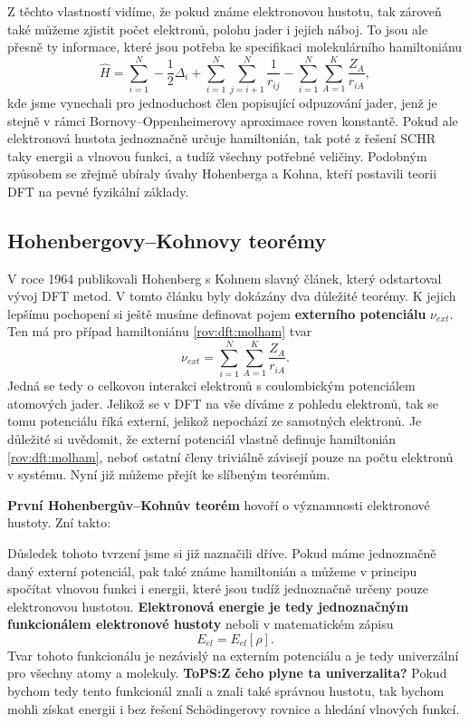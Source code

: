 Z těchto vlastností vidíme, že pokud známe elektronovou hustotu, tak zároveň také můžeme zjistit počet elektronů, polohu jader i jejich náboj. To jsou ale přesně ty informace, které jsou potřeba ke specifikaci molekulárního hamiltoniánu
\begin{equation}
\hat{H}=\sum_{i=1}^N -\frac{1}{2}\Delta_i+\sum_{i=1}^N\sum_{j=i+1}^N\frac{1}{r_{ij}}-\sum_{i=1}^N\sum_{A=1}^K \frac{Z_A}{r_{iA}} ,
\label{rov:dft:molham}
\end{equation}
kde jsme vynechali pro jednoduchost člen popisující odpuzování jader, jenž je stejně v rámci Bornovy--Oppenheimerovy aproximace roven konstantě. Pokud ale elektronová hustota jednoznačně určuje hamiltonián, tak poté z řešení SCHR taky energii a vlnovou funkci, a tudíž všechny potřebné veličiny. Podobným způsobem se zřejmě ubíraly úvahy Hohenberga a Kohna, kteří postavili teorii DFT na pevné fyzikální základy.

\subsection{Hohenbergovy--Kohnovy teorémy}

V roce 1964 publikovali Hohenberg s Kohnem slavný článek, který odstartoval vývoj DFT metod.
V tomto článku byly dokázány dva důležité teorémy. K jejich lepšímu pochopení si ještě musíme definovat pojem \textbf{externího potenciálu} $\nu_{ext}$. Ten má pro případ hamiltoniánu \eqref{rov:dft:molham} tvar
\begin{equation}
\nu_{ext} = \sum_{i=1}^N\sum_{A=1}^K \frac{Z_A}{r_{iA}} .
\end{equation} 
Jedná se tedy o celkovou interakci elektronů s coulombickým potenciálem atomových jader. Jelikož se v DFT na vše díváme z pohledu elektronů, tak se tomu potenciálu říká externí, jelikož nepochází ze samotných elektronů. Je důležité si uvědomit, že externí potenciál vlastně definuje hamiltonián \eqref{rov:dft:molham}, neboť ostatní členy triviálně závisejí pouze na počtu elektronů v systému. Nyní již můžeme přejít ke slíbeným teorémům.

\textbf{První Hohenbergův--Kohnův teorém} hovoří o významnosti elektronové hustoty. Zní takto:

\bigskip
\noindent {}

\bigskip
Důsledek tohoto tvrzení jsme si již naznačili dříve. Pokud máme jednoznačně daný externí potenciál, pak také známe hamiltonián a můžeme v principu spočítat vlnovou funkci i energii, které jsou tudíž jednoznačně určeny pouze elektronovou hustotou. \textbf{Elektronová energie je tedy jednoznačným funkcionálem elektronové hustoty} neboli v matematickém zápisu
\begin{equation}
E_{el}=E_{el}[\rho] .
\end{equation}
Tvar tohoto funkcionálu je nezávislý na externím potenciálu a je tedy univerzální pro všechny atomy a molekuly.
\textbf{ToPS:Z čeho plyne ta univerzalita?}
Pokud bychom tedy tento funkcionál znali a znali také správnou hustotu, tak bychom mohli získat energii i bez řešení Sch\"{o}dingerovy rovnice a hledání vlnových funkcí.


